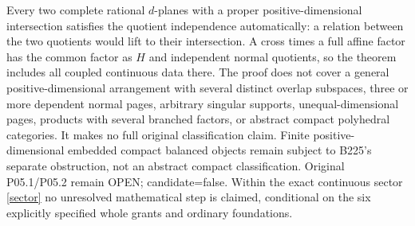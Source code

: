 \documentclass[11pt]{article}
\theoremstyle{definition}\newtheorem{definition}[theorem]{Definition}
\theoremstyle{remark}\newtheorem{remark}[theorem]{Remark}
\begin{document}
Every two complete rational $d$-planes with a proper positive-dimensional intersection satisfies the quotient independence automatically: a relation between the two quotients would lift to their intersection. A cross times a full affine factor has the common factor as $H$ and independent normal quotients, so the theorem includes all coupled continuous data there. The proof does not cover a general positive-dimensional arrangement with several distinct overlap subspaces, three or more dependent normal pages, arbitrary singular supports, unequal-dimensional pages, products with several branched factors, or abstract compact polyhedral categories. It makes no full original classification claim. Finite positive-dimensional embedded compact balanced objects remain subject to B225's separate obstruction, not an abstract compact classification. Original P05.1/P05.2 remain OPEN; candidate=false. Within the exact continuous sector \eqref{sector} no unresolved mathematical step is claimed, conditional on the six explicitly specified whole grants and ordinary foundations.
\end{document}
